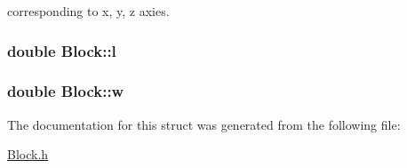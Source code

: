 corresponding to x, y, z axies. 

\hypertarget{structBlock_aad415a5d98d3645561306bf7d5bb22bb}{}
\subsubsection[{l}]{\setlength{\rightskip}{0pt plus 5cm}double Block\+::l}\label{structBlock_aad415a5d98d3645561306bf7d5bb22bb}
\hypertarget{structBlock_ae072df7850e56bf12d0234773e7eaa46}{}
\subsubsection[{w}]{\setlength{\rightskip}{0pt plus 5cm}double Block\+::w}\label{structBlock_ae072df7850e56bf12d0234773e7eaa46}


The documentation for this struct was generated from the following file\+:\begin{DoxyCompactItemize}
\item 
\hyperlink{Block_8h}{Block.\+h}\end{DoxyCompactItemize}
